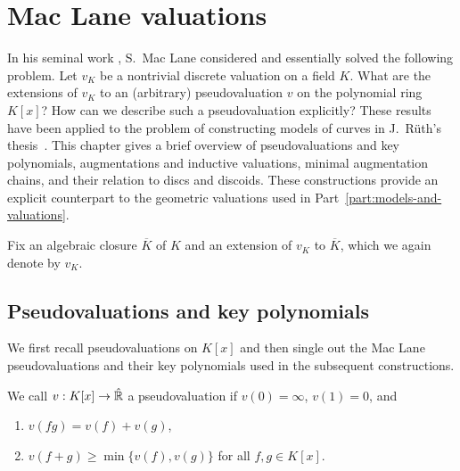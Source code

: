\chapter{Mac Lane valuations}\label{ch:mac-lane-valuations}

In his seminal work \cite{MacLane}, S.~Mac Lane considered and essentially solved the following problem.
Let $v_K$ be a nontrivial discrete valuation on a field $K$.
What are the extensions of $v_K$ to an (arbitrary) pseudovaluation $v$ on the polynomial ring $K[x]$?
How can we describe such a pseudovaluation explicitly?
These results have been applied to the problem of constructing models of curves in J.~Rüth's thesis~\cite{Rueth}.
This chapter gives a brief overview of pseudovaluations and key polynomials, augmentations and inductive valuations, minimal augmentation chains, and their relation to discs and discoids.
These constructions provide an explicit counterpart to the geometric valuations used in Part~\ref{part:models-and-valuations}.

Fix an algebraic closure $\overline K$ of $K$ and an extension of $v_K$ to $\overline K$, which we again denote by $v_K$.


\section{Pseudovaluations and key polynomials}\label{sec:pseudovaluations-and-key-polynomials}
We first recall pseudovaluations on $K[x]$ and then single out the Mac Lane pseudovaluations and their key polynomials used in the subsequent constructions.

\begin{definition} \label{def:pseudo-valuation}
    We call $v: K[x] \to \hat{\mathbb R}$ a pseudovaluation if $v(0) = \infty$, $v(1) = 0$, and
    \begin{enumerate}[label=\textup{(\alph*)}]
        \item $v(fg) = v(f) + v(g)$,
        \item $v(f + g) \geq \min\lbrace v(f), v(g) \rbrace$ for all $f,g\in K[x]$.
    \end{enumerate}
\end{definition}

